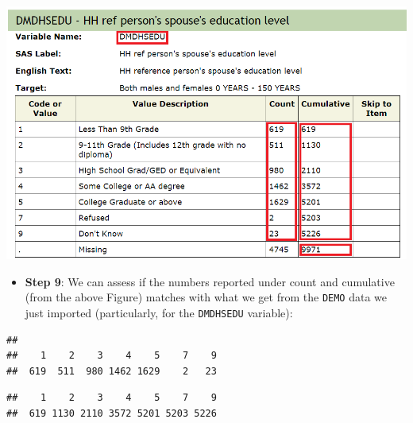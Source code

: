 \documentclass[
]{book}
\newenvironment{Shaded}{\begin{snugshade}}{\end{snugshade}}
\newcommand{\KeywordTok}[1]{\textcolor[rgb]{0.13,0.29,0.53}{\textbf{#1}}}
\newcommand{\NormalTok}[1]{#1}
\newcommand{\OperatorTok}[1]{\textcolor[rgb]{0.81,0.36,0.00}{\textbf{#1}}}
\providecommand{\tightlist}{%
  \setlength{\itemsep}{0pt}\setlength{\parskip}{0pt}}
\begin{document}
\includegraphics[width=0.65\linewidth]{images/DMDHSEDU}

\begin{itemize}
\tightlist
\item
  \textbf{Step 9}: We can assess if the numbers reported under count and cumulative (from the above Figure) matches with what we get from the \texttt{DEMO} data we just imported (particularly, for the \texttt{DMDHSEDU} variable):
\end{itemize}

\begin{Shaded}
\end{Shaded}

\begin{verbatim}
## 
##    1    2    3    4    5    7    9 
##  619  511  980 1462 1629    2   23
\end{verbatim}

\begin{Shaded}
\end{Shaded}

\begin{verbatim}
##    1    2    3    4    5    7    9 
##  619 1130 2110 3572 5201 5203 5226
\end{verbatim}

\begin{Shaded}
\end{Shaded}
\end{document}
